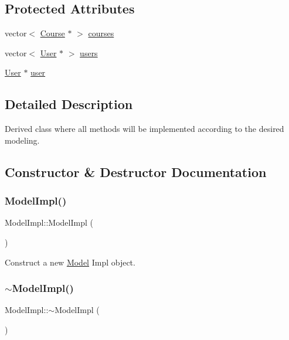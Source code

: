 \subsection*{Protected Attributes}
\begin{DoxyCompactItemize}
\item 
vector$<$ \hyperlink{classCourse}{Course} $\ast$ $>$ \hyperlink{classModelImpl_aa724c97a6f6614f92546e2332a0eb25c}{courses}
\item 
vector$<$ \hyperlink{classUser}{User} $\ast$ $>$ \hyperlink{classModelImpl_ae18f19dcf67479449d5e0684ed89320b}{users}
\item 
\hyperlink{classUser}{User} $\ast$ \hyperlink{classModelImpl_a76f8d6f7634f9395c2576a5d11628e13}{user}
\end{DoxyCompactItemize}


\subsection{Detailed Description}
Derived class where all methods will be implemented according to the desired modeling. 

\subsection{Constructor \& Destructor Documentation}
\mbox{\label{classModelImpl_a081505846c37ce9928f2176d77db4bc8}} 
\subsubsection{\texorpdfstring{Model\+Impl()}{ModelImpl()}}
{\footnotesize\ttfamily Model\+Impl\+::\+Model\+Impl (\begin{DoxyParamCaption}{ }\end{DoxyParamCaption})}



Construct a new \hyperlink{classModel}{Model} Impl object. 

\mbox{\label{classModelImpl_a427f422a6d356b94afbe3937d6452a2b}} 
\subsubsection{\texorpdfstring{$\sim$\+Model\+Impl()}{~ModelImpl()}}
{\footnotesize\ttfamily Model\+Impl\+::$\sim$\+Model\+Impl (\begin{DoxyParamCaption}{ }\end{DoxyParamCaption})}



